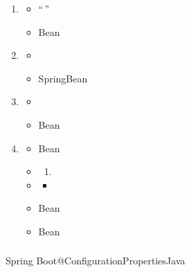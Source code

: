 \important{}

\begin{enumerate}
\def\labelenumi{\arabic{enumi}.}
\item
  \important{}

  \begin{itemize}
  \tightlist
  \item
    ``\,''
  \item
    Bean
  \end{itemize}
\item

  \begin{itemize}
  \item
  \item
    SpringBean
  \end{itemize}
\item
  \important{}

  \begin{itemize}
  \item
  \item
    Bean
  \end{itemize}
\item

  \begin{itemize}
  \item
    Bean
  \item
    \begin{enumerate}
    \def\labelenumii{\arabic{enumii}.}
        \item
      \important{}
    \end{enumerate}
  \item
    \begin{itemize}
    \tightlist
    \item
    \end{itemize}
  \item
    Bean
  \item
    Bean
  \end{itemize}
\end{enumerate}

\hypertarget{section-29}{%
\subsubsection{}\label{section-29}}

Spring
Boot@ConfigurationPropertiesJava


